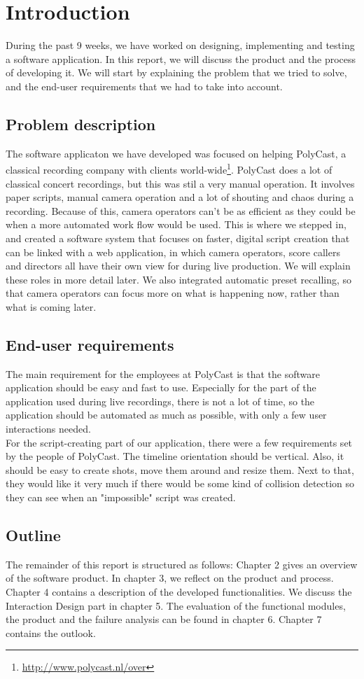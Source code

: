 \section{Introduction}

During the past 9 weeks, we have worked on designing, implementing and testing a software application. In this report, we will discuss the product and the process of developing it. We will start by explaining the problem that we tried to solve, and the end-user requirements that we had to take into account.

\subsection{Problem description}
The software applicaton we have developed was focused on helping PolyCast, a classical recording company with clients world-wide\footnote{\url{http://www.polycast.nl/over}}. PolyCast does a lot of classical concert recordings, but this was stil a very manual operation. It involves paper scripts, manual camera operation and a lot of shouting and chaos during a recording. Because of this, camera operators can't be as efficient as they could be when a more automated work flow would be used. This is where we stepped in, and created a software system that focuses on faster, digital script creation that can be linked with a web application, in which camera operators, score callers and directors all have their own view for during live production. We will explain these roles in more detail later. We also integrated automatic preset recalling, so that camera operators can focus more on what is happening now, rather than what is coming later.

\subsection{End-user requirements}
The main requirement for the employees at PolyCast is that the software application should be easy and fast to use. Especially for the part of the application used during live recordings, there is not a lot of time, so the application should be automated as much as possible, with only a few user interactions needed.\\
For the script-creating part of our application, there were a few requirements set by the people of PolyCast. The timeline orientation should be vertical. Also, it should be easy to create shots, move them around and resize them. Next to that, they would like it very much if there would be some kind of collision detection so they can see when an "impossible" script was created.

\subsection{Outline}
The remainder of this report is structured as follows: Chapter 2 gives an overview of the software product. In chapter 3, we reflect on the product and process. Chapter 4 contains a description of the developed functionalities. We discuss the Interaction Design part in chapter 5. The evaluation of the functional modules, the product and the failure analysis can be found in chapter 6. Chapter 7 contains the outlook.
